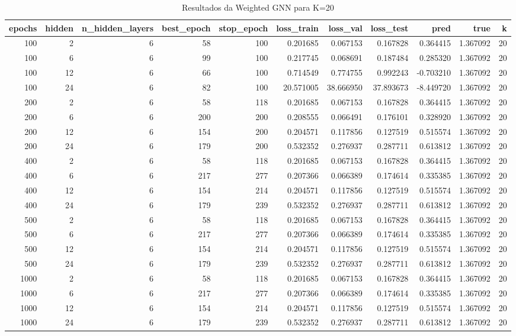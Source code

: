 \begin{table}
\caption{Resultados da Weighted GNN para K=20}
\label{tab:weighted_gnn_results_k20}
\begin{tabular}{rrrrrrrrrrr}
\toprule
epochs & hidden & n\_hidden\_layers & best\_epoch & stop\_epoch & loss\_train & loss\_val & loss\_test & pred & true & k \\
\midrule
100 & 2 & 6 & 58 & 100 & 0.201685 & 0.067153 & 0.167828 & 0.364415 & 1.367092 & 20 \\
100 & 6 & 6 & 99 & 100 & 0.217745 & 0.068691 & 0.187484 & 0.285320 & 1.367092 & 20 \\
100 & 12 & 6 & 66 & 100 & 0.714549 & 0.774755 & 0.992243 & -0.703210 & 1.367092 & 20 \\
100 & 24 & 6 & 82 & 100 & 20.571005 & 38.666950 & 37.893673 & -8.449720 & 1.367092 & 20 \\
200 & 2 & 6 & 58 & 118 & 0.201685 & 0.067153 & 0.167828 & 0.364415 & 1.367092 & 20 \\
200 & 6 & 6 & 200 & 200 & 0.208555 & 0.066491 & 0.176101 & 0.328920 & 1.367092 & 20 \\
200 & 12 & 6 & 154 & 200 & 0.204571 & 0.117856 & 0.127519 & 0.515574 & 1.367092 & 20 \\
200 & 24 & 6 & 179 & 200 & 0.532352 & 0.276937 & 0.287711 & 0.613812 & 1.367092 & 20 \\
400 & 2 & 6 & 58 & 118 & 0.201685 & 0.067153 & 0.167828 & 0.364415 & 1.367092 & 20 \\
400 & 6 & 6 & 217 & 277 & 0.207366 & 0.066389 & 0.174614 & 0.335385 & 1.367092 & 20 \\
400 & 12 & 6 & 154 & 214 & 0.204571 & 0.117856 & 0.127519 & 0.515574 & 1.367092 & 20 \\
400 & 24 & 6 & 179 & 239 & 0.532352 & 0.276937 & 0.287711 & 0.613812 & 1.367092 & 20 \\
500 & 2 & 6 & 58 & 118 & 0.201685 & 0.067153 & 0.167828 & 0.364415 & 1.367092 & 20 \\
500 & 6 & 6 & 217 & 277 & 0.207366 & 0.066389 & 0.174614 & 0.335385 & 1.367092 & 20 \\
500 & 12 & 6 & 154 & 214 & 0.204571 & 0.117856 & 0.127519 & 0.515574 & 1.367092 & 20 \\
500 & 24 & 6 & 179 & 239 & 0.532352 & 0.276937 & 0.287711 & 0.613812 & 1.367092 & 20 \\
1000 & 2 & 6 & 58 & 118 & 0.201685 & 0.067153 & 0.167828 & 0.364415 & 1.367092 & 20 \\
1000 & 6 & 6 & 217 & 277 & 0.207366 & 0.066389 & 0.174614 & 0.335385 & 1.367092 & 20 \\
1000 & 12 & 6 & 154 & 214 & 0.204571 & 0.117856 & 0.127519 & 0.515574 & 1.367092 & 20 \\
1000 & 24 & 6 & 179 & 239 & 0.532352 & 0.276937 & 0.287711 & 0.613812 & 1.367092 & 20 \\
\bottomrule
\end{tabular}
\end{table}
